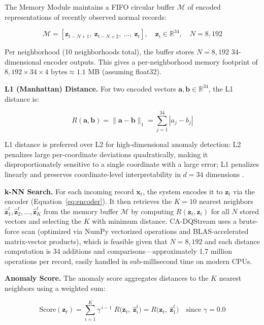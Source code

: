 The Memory Module maintains a FIFO circular buffer $\mathcal{M}$ of encoded representations of recently observed normal records:

\begin{equation}
\mathcal{M} = \left[\mathbf{z}_{t-N+1},\ \mathbf{z}_{t-N+2},\ \ldots,\ \mathbf{z}_t\right],
\quad \mathbf{z}_i \in \mathbb{R}^{34},
\quad N = 8{,}192
\label{eq:memory_buffer}
\end{equation}

Per neighborhood (10 neighborhoods total), the buffer stores $N = 8{,}192$ 34-dimensional encoder outputs. This gives a per-neighborhood memory footprint of $8{,}192 \times 34 \times 4\text{ bytes} \approx 1.1$ MB (assuming float32).

\textbf{L1 (Manhattan) Distance.} For two encoded vectors $\mathbf{a}, \mathbf{b} \in \mathbb{R}^{34}$, the L1 distance is:

\begin{equation}
R(\mathbf{a}, \mathbf{b}) = \|\mathbf{a} - \mathbf{b}\|_1
= \sum_{j=1}^{34} |a_j - b_j|
\label{eq:l1_distance}
\end{equation}

L1 distance is preferred over L2 for high-dimensional anomaly detection: L2 penalizes large per-coordinate deviations quadratically, making it disproportionately sensitive to a single coordinate with a large error; L1 penalizes linearly and preserves coordinate-level interpretability in $d = 34$ dimensions \citep{bhatia2022dense}.

\textbf{k-NN Search.} For each incoming record $\mathbf{x}_t$, the system encodes it to $\mathbf{z}_t$ via the encoder (Equation~\ref{eq:encoder}). It then retrieves the $K = 10$ nearest neighbors $\hat{\mathbf{z}}_1^t, \hat{\mathbf{z}}_2^t, \ldots, \hat{\mathbf{z}}_K^t$ from the memory buffer $\mathcal{M}$ by computing $R(\mathbf{z}_t, \mathbf{z}_i)$ for all $N$ stored vectors and selecting the $K$ with minimum distance. CA-DQStream uses a brute-force scan (optimized via NumPy vectorized operations and BLAS-accelerated matrix-vector products), which is feasible given that $N = 8{,}192$ and each distance computation is 34 additions and comparisons---approximately 1.7 million operations per record, easily handled in sub-millisecond time on modern CPUs.

\textbf{Anomaly Score.} The anomaly score aggregates distances to the $K$ nearest neighbors using a weighted sum:

\begin{equation}
\text{Score}(\mathbf{z}_t) = \sum_{i=1}^{K} \gamma^{\,i-1} \; R\!\big(\mathbf{z}_t,\ \hat{\mathbf{z}}_i^t\big)
= R\!\big(\mathbf{z}_t,\ \hat{\mathbf{z}}_1^t\big)
\quad \text{since } \gamma = 0.0
\label{eq:anomaly_score_v2}
\end{equation}

